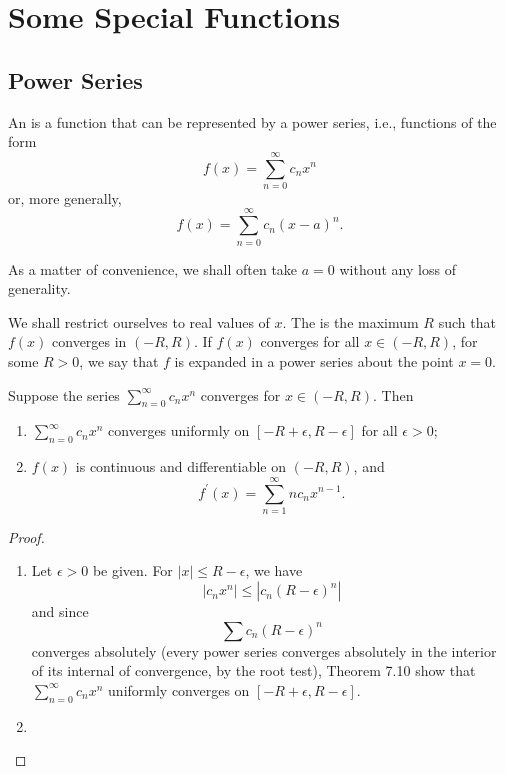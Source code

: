 \chapter{Some Special Functions}\label{chap:special-functions}
\section{Power Series}
\begin{definition}
An  is a function that can be represented by a power series, i.e., functions of the form
\[f(x)=\sum_{n=0}^\infty c_n x^n\]
or, more generally,
\[f(x)=\sum_{n=0}^\infty c_n(x-a)^n.\]
\end{definition}

As a matter of convenience, we shall often take $a=0$ without any loss of generality.

We shall restrict ourselves to real values of $x$. The  is the maximum $R$ such that $f(x)$ converges in $(-R,R)$. If $f(x)$ converges for all $x\in(-R,R)$, for some $R>0$, we say that $f$ is expanded in a power series about the point $x=0$.

\begin{proposition}
Suppose the series $\displaystyle\sum_{n=0}^\infty c_nx^n$ converges for $x\in(-R,R)$. Then
\begin{enumerate}[label=(\arabic*)]
\item $\displaystyle\sum_{n=0}^\infty c_nx^n$ converges uniformly on $[-R+\epsilon,R-\epsilon]$ for all $\epsilon>0$;
\item $f(x)$ is continuous and differentiable on $(-R,R)$, and 
\[f^\prime(x)=\sum_{n=1}^\infty nc_nx^{n-1}.\]
\end{enumerate}
\end{proposition}

\begin{proof} \
\begin{enumerate}[label=(\arabic*)]
\item Let $\epsilon>0$ be given. For $|x|\le R-\epsilon$, we have
\[|c_nx^n|\le|c_n(R-\epsilon)^n|\]
and since
\[\sum c_n(R-\epsilon)^n\]
converges absolutely (every power series converges absolutely in the interior of its internal of convergence, by the root test), Theorem 7.10 show that $\displaystyle\sum_{n=0}^\infty c_nx^n$ uniformly converges on $[-R+\epsilon,R-\epsilon]$.

\item 
\end{enumerate}
\end{proof}

